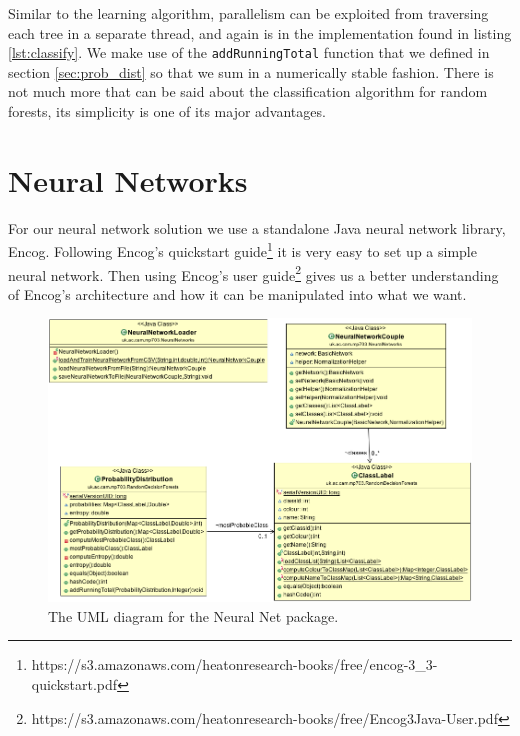 \documentclass[12pt,twoside,notitlepage]{report}
\begin{document}
          Similar to the learning algorithm, parallelism can be exploited from traversing each tree in a separate 
          thread, and again is in the implementation found in listing \ref{lst:classify}. We make use of the 
          \texttt{addRunningTotal} function that we defined in section \ref{sec:prob_dist} so that we sum in a 
          numerically stable fashion. There is not much more that can be said about the classification algorithm for 
          random forests, its simplicity is one of its major advantages.






    \section{Neural Networks} \label{sec:nn_training} \label{sec:pixel_label}
        For our neural network solution we use a standalone Java neural network library, Encog. Following Encog's quickstart 
        guide\footnote{https://s3.amazonaws.com/heatonresearch-books/free/encog-3\_3-quickstart.pdf} it is very easy to 
        set up a simple neural network. Then using Encog's user 
        guide\footnote{https://s3.amazonaws.com/heatonresearch-books/free/Encog3Java-User.pdf} gives us a better 
        understanding of Encog's architecture and how it can be manipulated into what we want.         

        \begin{figure}
            \centering
            \includegraphics[scale=0.4]{NeuralNet_UML}
            \caption{The UML diagram for the Neural Net package.}
        \end{figure}
\end{document}
